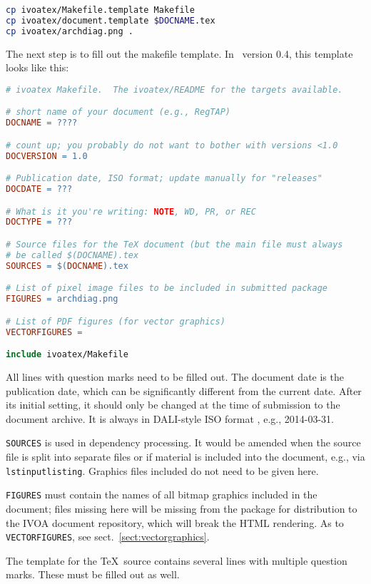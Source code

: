 \documentclass[11pt,a4paper]{ivoa}
\newcommand{\texword}[1]{\texttt{\color{texcolor} #1}}
\begin{document}
\begin{lstlisting}[language=sh]
cp ivoatex/Makefile.template Makefile
cp ivoatex/document.template $DOCNAME.tex
cp ivoatex/archdiag.png .
\end{lstlisting}

The next step is to fill out the makefile template.  
In \ivoatex\ version 0.4, this template looks like this:

\begin{lstlisting}[language=make]
# ivoatex Makefile.  The ivoatex/README for the targets available.

# short name of your document (e.g., RegTAP)
DOCNAME = ????

# count up; you probably do not want to bother with versions <1.0
DOCVERSION = 1.0

# Publication date, ISO format; update manually for "releases"
DOCDATE = ???

# What is it you're writing: NOTE, WD, PR, or REC
DOCTYPE = ???

# Source files for the TeX document (but the main file must always
# be called $(DOCNAME).tex
SOURCES = $(DOCNAME).tex

# List of pixel image files to be included in submitted package 
FIGURES = archdiag.png

# List of PDF figures (for vector graphics)
VECTORFIGURES = 

include ivoatex/Makefile
\end{lstlisting}

All lines with question marks need to be filled out.  The document date
is the publication date, which can be significantly different from the
current date.  After its initial setting, it should only be changed at
the time of submission to the document archive.  It is always in
DALI-style ISO format \citep{std:DALI}, e.g., 2014-03-31.

\texttt{SOURCES} is used in dependency processing.  It would be amended
when the source file is split into separate files or if material is
included into the document, e.g., via \texword{lstinputlisting}.
Graphics files included do not need to be given here.

\texttt{FIGURES} must contain the names of all bitmap graphics included
in the document; files missing here will be missing from the package for
distribution to the IVOA document repository, which will break the HTML
rendering.  As to \texttt{VECTORFIGURES}, see
sect.~\ref{sect:vectorgraphics}.

The template for the \TeX\ source contains several lines with
multiple question marks.  These must be filled out as well.
\end{document}
